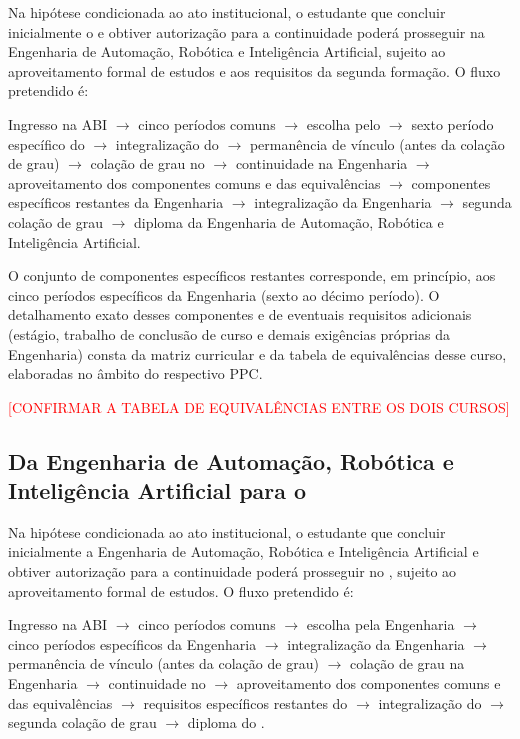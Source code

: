 Na hipótese condicionada ao ato institucional, o estudante que concluir inicialmente o \ppccurso e obtiver autorização para a continuidade poderá prosseguir na Engenharia de Automação, Robótica e Inteligência Artificial, sujeito ao aproveitamento formal de estudos e aos requisitos da segunda formação. O fluxo pretendido é:

\begin{center}
Ingresso na ABI $\to$ cinco períodos comuns $\to$ escolha pelo \ppccurso $\to$ sexto período específico do \ppccurso $\to$ integralização do \ppccurso $\to$ permanência de vínculo (antes da colação de grau) $\to$ colação de grau no \ppccurso $\to$ continuidade na Engenharia $\to$ aproveitamento dos componentes comuns e das equivalências $\to$ componentes específicos restantes da Engenharia $\to$ integralização da Engenharia $\to$ segunda colação de grau $\to$ diploma da Engenharia de Automação, Robótica e Inteligência Artificial.
\end{center}

O conjunto de componentes específicos restantes corresponde, em princípio, aos cinco períodos específicos da Engenharia (sexto ao décimo período). O detalhamento exato desses componentes e de eventuais requisitos adicionais (estágio, trabalho de conclusão de curso e demais exigências próprias da Engenharia) consta da matriz curricular e da tabela de equivalências desse curso, elaboradas no âmbito do respectivo PPC.

\textcolor{red}{[CONFIRMAR A TABELA DE EQUIVALÊNCIAS ENTRE OS DOIS CURSOS]}

\subsection{Da Engenharia de Automação, Robótica e Inteligência Artificial para o \ppccurso}

Na hipótese condicionada ao ato institucional, o estudante que concluir inicialmente a Engenharia de Automação, Robótica e Inteligência Artificial e obtiver autorização para a continuidade poderá prosseguir no \ppccurso, sujeito ao aproveitamento formal de estudos. O fluxo pretendido é:

\begin{center}
Ingresso na ABI $\to$ cinco períodos comuns $\to$ escolha pela Engenharia $\to$ cinco períodos específicos da Engenharia $\to$ integralização da Engenharia $\to$ permanência de vínculo (antes da colação de grau) $\to$ colação de grau na Engenharia $\to$ continuidade no \ppccurso $\to$ aproveitamento dos componentes comuns e das equivalências $\to$ requisitos específicos restantes do \ppccurso $\to$ integralização do \ppccurso $\to$ segunda colação de grau $\to$ diploma do \ppccurso.
\end{center}

